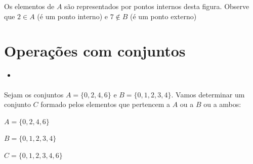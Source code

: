 \documentclass[11pt, openright, a4paper, brazil, english, french, spanish, bibjustif, openany, oneside]{abntex2}
\begin{document}
\begin{SingleSpace}
\begin{minipage}{.4\linewidth}
\begin{figure}[H]
\end{figure} 

\end{minipage}
\begin{minipage}{.6\linewidth}

Os elementos de $A$ são representados por pontos internos desta figura. Observe que $2 \in A$ (é um ponto interno) e $7 \not\in B$ (é um ponto externo)

\end{minipage}

\vspace{1cm}

\section*{Operações com conjuntos}

\vspace{.5cm}

\begin{itemize}

\item \textbf{}

\end{itemize}

Sejam os conjuntos $A=\{0, 2, 4, 6\}$ e $B=\{0, 1, 2, 3, 4\}$. Vamos determinar um conjunto $C$ formado pelos elementos que pertencem a $A$ ou a $B$ ou a ambos:

\begin{center}
\begin{minipage}{.3\linewidth}

\begin{flushright}

$A=\{0, 2, 4, 6\}$

$B=\{0, 1, 2, 3, 4\}$

\end{flushright}

\end{minipage}
\begin{minipage}{.2\linewidth}

\resizebox{3cm}{.4cm}{$\Rightarrow$}

\end{minipage}
\begin{minipage}{.3\linewidth}

\begin{flushleft}

$C=\{0, 1, 2, 3, 4, 6\}$

\end{flushleft}


\end{minipage}
\end{center}
\end{SingleSpace}
\end{document}
